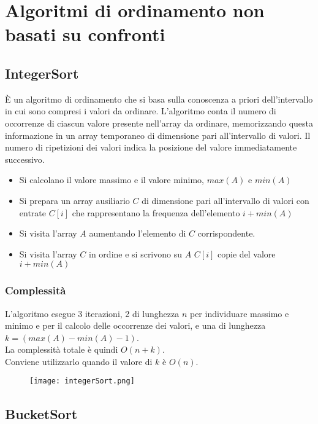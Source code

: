 \section[Ordinamento senza confronti]{Algoritmi di ordinamento non basati su confronti}
\subsection{IntegerSort}
È un algoritmo di ordinamento che si basa sulla conoscenza a priori dell'intervallo in cui sono compresi i valori da ordinare.
L'algoritmo conta il numero di occorrenze di ciascun valore presente nell'array 
da ordinare, memorizzando questa informazione in un array temporaneo di dimensione
pari all'intervallo di valori. Il numero di ripetizioni dei valori indica
la posizione del valore immediatamente successivo. 
\begin{itemize}
    \item Si calcolano il valore massimo e il valore minimo, $max(A)$ e $min(A)$
    \item Si prepara un array ausiliario $C$ di dimensione pari all'intervallo 
    di valori con entrate $C[i]$ che rappresentano la frequenza dell'elemento
    $i + min(A)$
    \item Si visita l'array $A$ aumentando l'elemento di $C$ corrispondente.
    \item Si visita l'array $C$ in ordine e si scrivono su $A$ $C[i]$ copie del valore $i + min(A)$ 
\end{itemize}

\subsubsection*{Complessità}
L'algoritmo esegue 3 iterazioni, 2 di lunghezza $n$ per individuare massimo e minimo e per il calcolo delle
occorrenze dei valori, e una di lunghezza $k = (max(A)- min(A) - 1)$.\\
La complessità totale è quindi $O(n+k)$. \\
Conviene utilizzarlo quando il valore di $k$ è $O(n)$.

\begin{figure}[h]
    \texttt{[image: integerSort.png]}
\end{figure}
\clearpage

\subsection{BucketSort}

